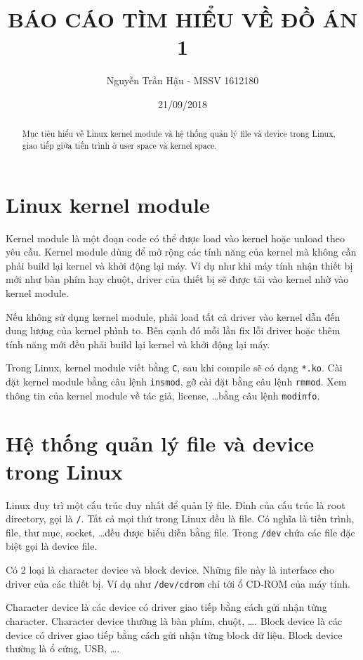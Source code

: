 \documentclass[12pt]{article}
\begin{document}
\title{BÁO CÁO TÌM HIỂU VỀ ĐỒ ÁN 1}
\author{Nguyễn Trần Hậu - MSSV 1612180}
\date{21/09/2018}
\maketitle

\begin{abstract}
Mục tiêu hiểu về Linux kernel module và hệ thống quản lý file và device trong Linux, 
giao tiếp giữa tiến trình ở user space và kernel space.
\end{abstract}

\section{Linux kernel module}

Kernel module là một đoạn code có thể được load vào kernel hoặc unload theo yêu cầu.
Kernel module dùng để mở rộng các tính năng của kernel mà không cần phải build lại kernel và khởi động lại máy.
Ví dụ như khi máy tính nhận thiết bị mới như bàn phím hay chuột, driver của thiết bị sẽ được tải vào kernel nhờ vào kernel module.

Nếu không sử dụng kernel module, phải load tất cả driver vào kernel dẫn đến dung lượng của kernel phình to. 
Bên cạnh đó mỗi lần fix lỗi driver hoặc thêm tính năng mới đều phải build lại kernel và khởi động lại máy.

Trong Linux, kernel module viết bằng \texttt{C}, sau khi compile sẽ có dạng \texttt{*.ko}. 
Cài đặt kernel module bằng câu lệnh \texttt{insmod}, gỡ cài đặt bằng câu lệnh \texttt{rmmod}. 
Xem thông tin của kernel module về tác giả, license, \dots bằng câu lệnh \texttt{modinfo}.

\section{Hệ thống quản lý file và device trong Linux}

Linux duy trì một cấu trúc duy nhất để quản lý file. 
Đỉnh của cấu trúc là root directory, gọi là \texttt{/}. 
Tất cả mọi thứ trong Linux đều là file\cite{file}. 
Có nghĩa là tiến trình, file, thư mục, socket, \dots đều được biểu diễn bằng file. 
Trong \texttt{/dev} chứa các file đặc biệt gọi là device file.

Có 2 loại là character device và block device. 
Những file này là interface cho driver của các thiết bị. 
Ví dụ như \texttt{/dev/cdrom} chỉ tới ổ CD-ROM của máy tính.

Character device là các device có driver giao tiếp bằng cách gửi nhận từng character. 
Character device thường là bàn phím, chuột, \dots . 
Block device là các device có driver giao tiếp bằng cách gửi nhận từng block dữ liệu. 
Block device thường là ổ cứng, USB, \dots .
\end{document}
